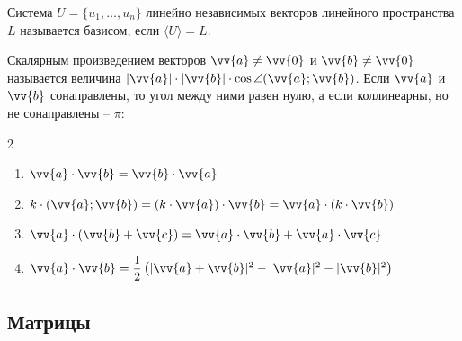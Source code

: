 \documentclass[12pt]{article}
\begin{document}
\begin{definition}
    Система $U=\{u_1,\ldots,u_n\}$ линейно независимых векторов линейного пространства $L$ называется базисом, если $\langle U \rangle=L$.
\end{definition}
\begin{definition}
    Скалярным произведением векторов $\vv{a}\neq\vv{0}$ и $\vv{b}\neq\vv{0}$ называется величина $|\vv{a}|\cdot|\vv{b}|\cdot\cos\angle(\vv{a};\vv{b})$. Если $\vv{a}$ и $\vv{b}$ сонаправлены, то угол между ними равен нулю, а если коллинеарны, но не сонаправлены – $\pi$:
    \begin{center}
        \begin{multicols}{2}
            \begin{enumerate}
                \item $\vv{a}\cdot\vv{b}=\vv{b}\cdot\vv{a}$\\
                \item $k\cdot(\vv{a};\vv{b})=(k\cdot\vv{a})\cdot\vv{b}=\vv{a}\cdot(k\cdot\vv{b})$\\
                \item $\vv{a}\cdot(\vv{b}+\vv{c})=\vv{a}\cdot\vv{b}+\vv{a}\cdot\vv{c}$\\
                \item $\vv{a}\cdot\vv{b}=\dfrac{1}{2}\left(|\vv{a}+\vv{b}|^2-|\vv{a}|^2-|\vv{b}|^2\right)$
            \end{enumerate}
        \end{multicols}
    \end{center}
\end{definition}

\subsection{Матрицы}
\end{document}
